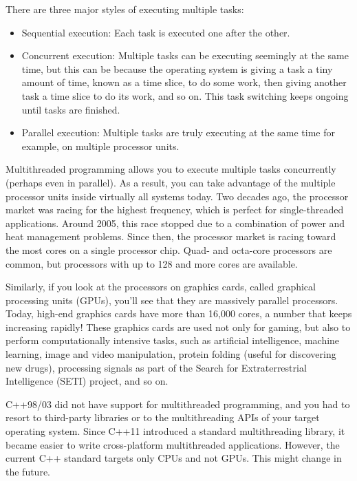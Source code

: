 

There are three major styles of executing multiple tasks:

\begin{itemize}
\item
Sequential execution: Each task is executed one after the other.

\item
Concurrent execution: Multiple tasks can be executing seemingly at the same time, but this can be because the operating system is giving a task a tiny amount of time, known as a time slice, to do some work, then giving another task a time slice to do its work, and so on. This task switching keeps ongoing until tasks are finished.

\item
Parallel execution: Multiple tasks are truly executing at the same time for example, on multiple processor units.
\end{itemize}

Multithreaded programming allows you to execute multiple tasks concurrently (perhaps even in parallel). As a result, you can take advantage of the multiple processor units inside virtually all systems today. Two decades ago, the processor market was racing for the highest frequency, which is perfect for single-threaded applications. Around 2005, this race stopped due to a combination of power and heat management problems. Since then, the processor market is racing toward the most cores on a single processor chip. Quad- and octa-core processors are common, but processors with up to 128 and more cores are available.

Similarly, if you look at the processors on graphics cards, called graphical processing units (GPUs), you’ll see that they are massively parallel processors. Today, high-end graphics cards have more than 16,000 cores, a number that keeps increasing rapidly! These graphics cards are used not only for gaming, but also to perform computationally intensive tasks, such as artificial intelligence, machine learning, image and video manipulation, protein folding (useful for discovering new drugs), processing signals as part of the Search for Extraterrestrial Intelligence (SETI) project, and so on.

C++98/03 did not have support for multithreaded programming, and you had to resort to third-party libraries or to the multithreading APIs of your target operating system. Since C++11 introduced a standard multithreading library, it became easier to write cross-platform multithreaded applications.
However, the current C++ standard targets only CPUs and not GPUs. This might change in the future.

